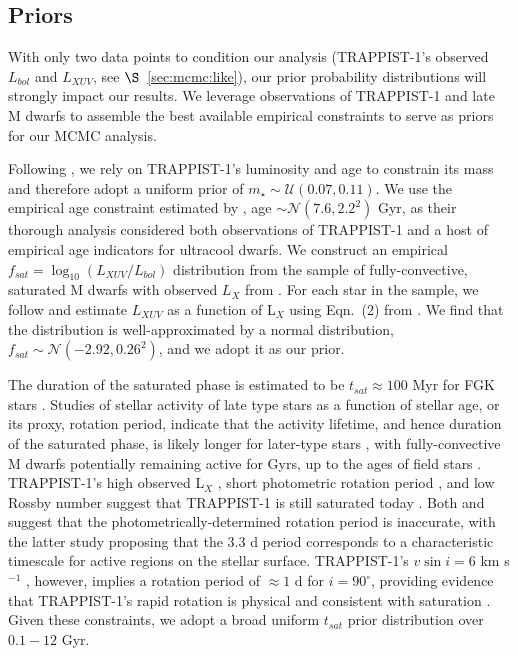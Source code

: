 \documentclass[twocolumn]{aastex62}
\begin{document}
\subsection{Priors} \label{sec:mcmc:priors}

With only two data points to condition our analysis (TRAPPIST-1's observed $L_{bol}$ and $L_{XUV}$, see $\S$~\ref{sec:mcmc:like}), our prior probability distributions will strongly impact our results. We leverage observations of TRAPPIST-1 and late M dwarfs to assemble the best available empirical constraints to serve as priors for our MCMC analysis.  

Following \citet{vanGrootel2018}, we rely on TRAPPIST-1's luminosity and age to constrain its mass and therefore adopt a uniform prior of $m_{\star} \sim \mathcal{U}(0.07, 0.11)$. We use the empirical age constraint estimated by \citet{Burgasser2017}, age $\sim \mathcal{N}(7.6, 2.2^2)$ Gyr, as their thorough analysis considered both observations of TRAPPIST-1 and a host of empirical age indicators for ultracool dwarfs. We construct an empirical $f_{sat} = \log_{10}(L_{XUV}/L_{bol})$ distribution from the sample of fully-convective, saturated M dwarfs with observed $L_{X}$ from \citet{Wright2011}. For each star in the \citet{Wright2011} sample, we follow \citet{Wheatley2017} and estimate $L_{XUV}$ as a function of L$_{X}$ using Eqn.~(2) from \citet{Chadney2015}. We find that the distribution is well-approximated by a normal distribution, $f_{sat} \sim \mathcal{N}(-2.92, 0.26^2)$, and we adopt it as our prior.  

The duration of the saturated phase is estimated to be $t_{sat} \approx 100$ Myr for FGK stars \citep{Jackson2012}. Studies of stellar activity of late type stars as a function of stellar age, or its proxy, rotation period, indicate that the activity lifetime, and hence duration of the saturated phase, is likely longer for later-type stars \citep{Shkolnik2014,Wright2011,West2015,GonzalezAlvarez2019}, with fully-convective M dwarfs potentially remaining active for Gyrs, up to the ages of field stars \citep{West2008,Schneider2018}. TRAPPIST-1's high observed L$_{X}$ \citep{Wheatley2017}, short photometric rotation period \citep[3.3 d, ][]{Luger2017}, and low Rossby number \citep[Ro $\approx 0.01$, ][]{Roettenbacher2017} suggest that TRAPPIST-1 is still saturated today \citep{Pizzolato2003,Wright2011,Wright2018,Garraffo2017,GonzalezAlvarez2019}. Both \citet{Roettenbacher2017} and \citet{Morris2018} suggest that the photometrically-determined rotation period is inaccurate, with the latter study proposing that the 3.3 d period corresponds to a characteristic timescale for active regions on the stellar surface. TRAPPIST-1's $v \sin i = 6$ km s$^{-1}$ \citep{Barnes2014}, however, implies a rotation period of $\approx 1$ d for $i = 90^{\circ}$, providing evidence that TRAPPIST-1's rapid rotation is physical and consistent with saturation \citep{Wright2018}. Given these constraints, we adopt a broad uniform $t_{sat}$ prior distribution over $0.1 - 12$ Gyr.
\end{document}
